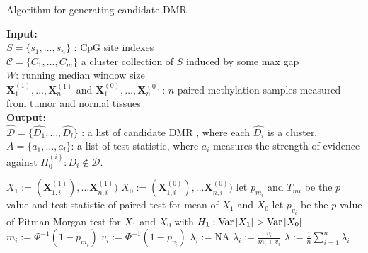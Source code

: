 \documentclass{report}
\begin{document}
\begin{algorithm}
    \caption{Algorithm for generating candidate DMR \cite{wang2017accounting}} \label{algorithm : generating candidate DMRs}
    \hspace*{0.02in} {\bf Input:} \\
     $S = \{ s_1, \ldots, s_n\}$ : CpG site indexes  \\
      $\mathcal{C} = \{C_1,\ldots,C_m\}$ a cluster collection of $S$ induced by some max gap \\
     $W$: running median window size \\
     $\mathbf{X}_1^{(1)}, \ldots, \mathbf{X}_n^{(1)}$ and $\mathbf{X}_1^{(0)}, \ldots, \mathbf{X}_n^{(0)}$:  
     $n$ paired methylation samples measured from tumor and normal tissues  \\
     \hspace*{0.02in} {\bf Output:} \\
       $\hat{\mathcal{D}} = \{\hat{D_1}, \ldots, \hat{D_l}\}$ : a list of candidate DMR , where each $\hat{D_i}$ is a cluster. \\
       $A = \{a_1, \ldots, a_l\}$: a list of test statistic, where $a_i$ measures the strength of evidence against $H_0^{(i)} : D_i \notin \mathcal{D}$.\\
       \begin{algorithmic}[1]
            
                \State $X_1 := (\mathbf{X}_{1,i}^{(1)}), \ldots \mathbf{X}_{n,i}^{(1)})$ 
                \State $X_0 := (\mathbf{X}_{1,i}^{(0)}), \ldots \mathbf{X}_{n,i}^{(0)})$
                \State let $p_{m_i}$ and $T_{mi}$ be the $p$ value and test statistic of paired test for mean of $X_1$ and $X_0$
                \State let $p_{v_i}$ be the $p$ value of Pitman-Morgan test for $X_1$ and $X_0$ with $H_1 : \mathrm{Var} \left[ X_1 \right] > \mathrm{Var} \left[ X_0 \right]$ 
                \State $m_i := \Phi^{-1}(1- p_{m_i})$ 
                \State $v_i := \Phi^{-1}(1- p_{v_i})$
                    \State $\lambda_i := \mathrm{NA}$ 
                \Else
                    \State $\lambda_i := \frac{v_i}{m_i+v_i}$
                \EndIf   
                \EndFor
        \State $\lambda := \frac{1}{n} \sum_{i=1}^n \lambda_i$ 

\end{algorithmic}
\end{algorithm}
\end{document}
